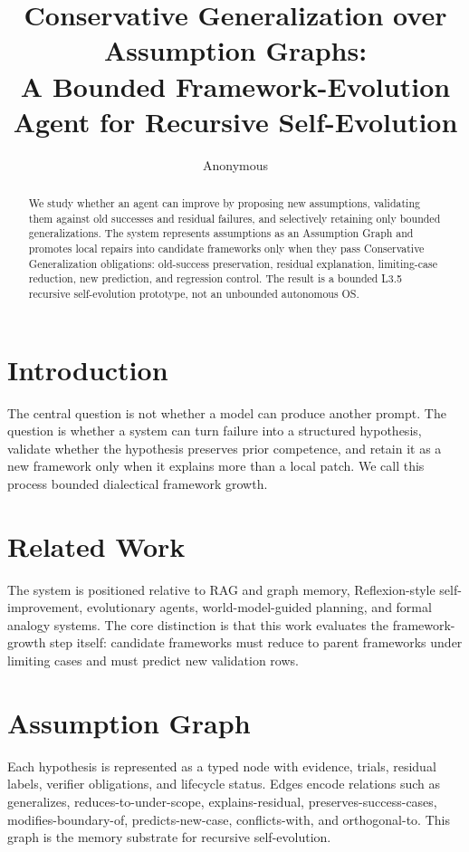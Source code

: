 \documentclass[11pt]{article}
\title{Conservative Generalization over Assumption Graphs:\\
A Bounded Framework-Evolution Agent for Recursive Self-Evolution}
\author{Anonymous}
\date{}
\begin{document}
\maketitle

\begin{abstract}
We study whether an agent can improve by proposing new assumptions, validating
them against old successes and residual failures, and selectively retaining only
bounded generalizations.  The system represents assumptions as an Assumption
Graph and promotes local repairs into candidate frameworks only when they pass
Conservative Generalization obligations: old-success preservation, residual
explanation, limiting-case reduction, new prediction, and regression control.
The result is a bounded L3.5 recursive self-evolution prototype, not an
unbounded autonomous OS.
\end{abstract}

\section{Introduction}

The central question is not whether a model can produce another prompt.  The
question is whether a system can turn failure into a structured hypothesis,
validate whether the hypothesis preserves prior competence, and retain it as a
new framework only when it explains more than a local patch.  We call this
process bounded dialectical framework growth.

\section{Related Work}

The system is positioned relative to RAG and graph memory, Reflexion-style
self-improvement, evolutionary agents, world-model-guided planning, and formal
analogy systems.  The core distinction is that this work evaluates the
framework-growth step itself: candidate frameworks must reduce to parent
frameworks under limiting cases and must predict new validation rows.

\section{Assumption Graph}

Each hypothesis is represented as a typed node with evidence, trials, residual
labels, verifier obligations, and lifecycle status.  Edges encode relations
such as generalizes, reduces-to-under-scope, explains-residual,
preserves-success-cases, modifies-boundary-of, predicts-new-case, conflicts-with,
and orthogonal-to.  This graph is the memory substrate for recursive
self-evolution.
\end{document}
